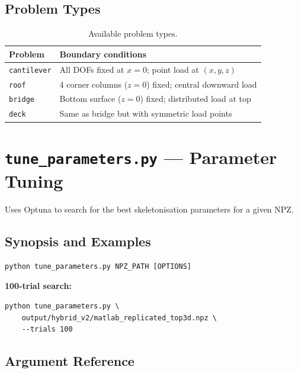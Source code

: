 \documentclass[a4paper, 11pt, openany]{report}
\begin{document}
\subsection{Problem Types}

\begin{table}[htbp]
\caption{Available problem types.}
\label{tab:problem-types}
\centering
\begin{tabularx}{\textwidth}{lX}
\toprule
Problem & Boundary conditions \\
\midrule
\texttt{cantilever} & All DOFs fixed at $x=0$; point load at $(x, y, z)$ \\
\texttt{roof} & 4 corner columns ($z=0$) fixed; central downward load \\
\texttt{bridge} & Bottom surface ($z=0$) fixed; distributed load at top \\
\texttt{deck} & Same as bridge but with symmetric load points \\
\bottomrule
\end{tabularx}
\end{table}


\section{\texttt{tune\_parameters.py} --- Parameter Tuning}
\label{sec:cli-tune}

Uses Optuna to search for the best skeletonisation parameters for a given NPZ.

\subsection{Synopsis and Examples}

\begin{lstlisting}[style=bashstyle]
python tune_parameters.py NPZ_PATH [OPTIONS]
\end{lstlisting}

\textbf{100-trial search:}
\begin{lstlisting}[style=bashstyle]
python tune_parameters.py \
    output/hybrid_v2/matlab_replicated_top3d.npz \
    --trials 100
\end{lstlisting}

\subsection{Argument Reference}
\end{document}
